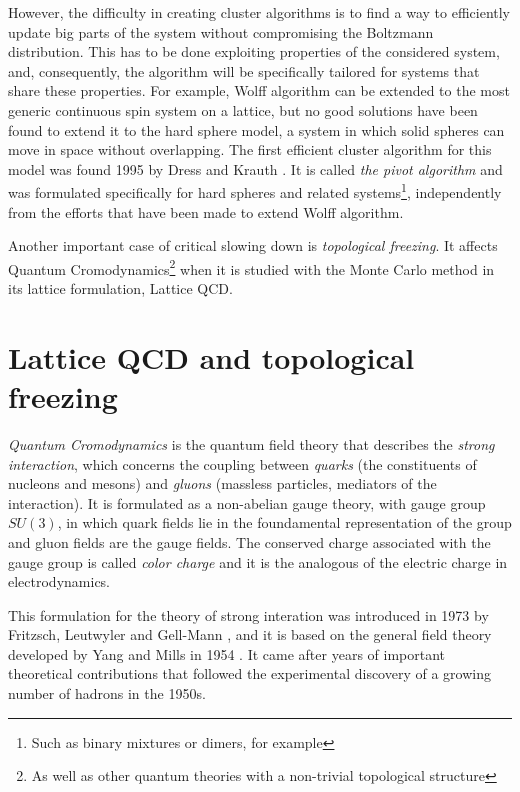 However, the difficulty in creating cluster algorithms is to find a way to efficiently update big parts of the system without compromising the Boltzmann distribution.
This has to be done exploiting properties of the considered system, and, consequently, the algorithm will be specifically tailored for systems that share these properties.
For example, Wolff algorithm can be extended to the most generic continuous spin system on a lattice,
but no good solutions have been found to extend it to the hard sphere model,
\ie a system in which solid spheres can move in space without overlapping.
The first efficient cluster algorithm for this model was found 1995 by Dress and Krauth \cite{dress-krauth:1995}.
It is called \emph{the pivot algorithm} and was formulated specifically for hard spheres and related systems\footnote{Such as binary mixtures or dimers, for example},
independently from the efforts that have been made to extend Wolff algorithm.

Another important case of critical slowing down is \emph{topological freezing}.
It affects Quantum Cromodynamics\footnote{As well as other quantum theories with a non-trivial topological structure}
when it is studied with the Monte Carlo method in its lattice formulation, \ie Lattice QCD.

\section*{Lattice QCD and topological freezing}
\emph{Quantum Cromodynamics} is the quantum field theory that describes the \emph{strong interaction},
which concerns the coupling between \emph{quarks} (the constituents of nucleons and mesons) and \emph{gluons} (massless particles, mediators of the interaction).
It is formulated as a non-abelian gauge theory, with gauge group $SU(3)$,
in which quark fields lie in the foundamental representation of the group and gluon fields are the gauge fields.
The conserved charge associated with the gauge group is called \emph{color charge} and it is the analogous of the electric charge in electrodynamics.

This formulation for the theory of strong interation was introduced in 1973 by Fritzsch, Leutwyler and Gell-Mann \cite{fritzsch:1973},
and it is based on the general field theory developed by Yang and Mills in 1954 \cite{yang-mills:1954}.
It came after years of important theoretical contributions that followed the experimental discovery of a growing number of hadrons in the 1950s.


